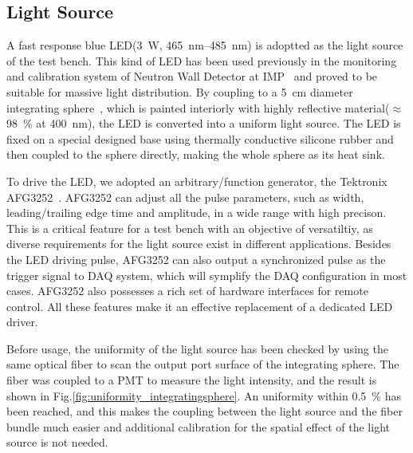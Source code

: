 \documentclass[5p, times]{elsarticle}
\begin{document}
\subsection{Light Source}
\label{sec:light_source}

A fast response blue LED(\SI{3}{\watt}, \SIrange{465}{485}{\nano\meter}) is adoptted as the light source of the test bench. 
This kind of LED has been used previously in the monitoring and calibration system of Neutron Wall Detector at IMP~\cite{yuyuhong_led} and proved to be suitable for massive light distribution. 
By coupling to a \SI{5}{\centi\meter} diameter integrating sphere~\cite{integrating_sphere}, which is painted interiorly with highly reflective material($\approx$\SI{98}{\percent} at \SI{400}{\nano\meter}), the LED is converted into a uniform light source.
The LED is fixed on a special designed base using thermally conductive silicone rubber and then coupled to the sphere directly, making the whole sphere as its heat sink.

To drive the LED, we adopted an arbitrary/function generator, the Tektronix AFG3252~\cite{afg3252}. 
AFG3252 can adjust all the pulse parameters, such as width, leading/trailing edge time and amplitude, in a wide range with high precison. 
This is a critical feature for a test bench with an objective of versatiltiy, as diverse requirements for the light source exist in different applications. 
Besides the LED driving pulse, AFG3252 can also output a synchronized pulse as the trigger signal to DAQ system, which will symplify the DAQ configuration in most cases. 
AFG3252 also possesses a rich set of hardware interfaces for remote control.
All these features make it an effective replacement of a dedicated LED driver. 

Before usage, the uniformity of the light source has been checked by using the same optical fiber to scan the output port surface of the integrating sphere. 
The fiber was coupled to a PMT to measure the light intensity, and the result is shown in Fig.\ref{fig:uniformity_integratingsphere}. 
An uniformity within \textpm\SI{0.5}{\percent} has been reached, and this makes the coupling between the light source and the fiber bundle much easier and additional calibration for the spatial effect of the light source is not needed. 
\end{document}
